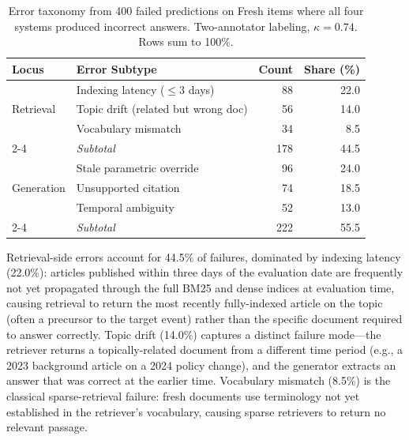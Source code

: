 \begin{table}[t]
\centering
\small
\caption{Error taxonomy from 400 failed predictions on Fresh items where all four systems produced incorrect answers. Two-annotator labeling, $\kappa = 0.74$. Rows sum to 100\%.}
\label{tab:error-analysis}
\begin{tabular}{llrr}
\toprule
Locus & Error Subtype & Count & Share (\%) \\
\midrule
\multirow{3}{*}{Retrieval} & Indexing latency ($\leq$3 days) & 88 & 22.0 \\
                           & Topic drift (related but wrong doc) & 56 & 14.0 \\
                           & Vocabulary mismatch & 34 & 8.5 \\
\cmidrule(lr){2-4}
                           & \textit{Subtotal} & 178 & 44.5 \\
\midrule
\multirow{3}{*}{Generation} & Stale parametric override & 96 & 24.0 \\
                            & Unsupported citation & 74 & 18.5 \\
                            & Temporal ambiguity & 52 & 13.0 \\
\cmidrule(lr){2-4}
                            & \textit{Subtotal} & 222 & 55.5 \\
\bottomrule
\end{tabular}
\end{table}

Retrieval-side errors account for 44.5\% of failures, dominated by indexing latency (22.0\%): articles published within three days of the evaluation date are frequently not yet propagated through the full BM25 and dense indices at evaluation time, causing retrieval to return the most recently fully-indexed article on the topic (often a precursor to the target event) rather than the specific document required to answer correctly. Topic drift (14.0\%) captures a distinct failure mode---the retriever returns a topically-related document from a different time period (e.g., a 2023 background article on a 2024 policy change), and the generator extracts an answer that was correct at the earlier time. Vocabulary mismatch (8.5\%) is the classical sparse-retrieval failure: fresh documents use terminology not yet established in the retriever's vocabulary, causing sparse retrievers to return no relevant passage.

